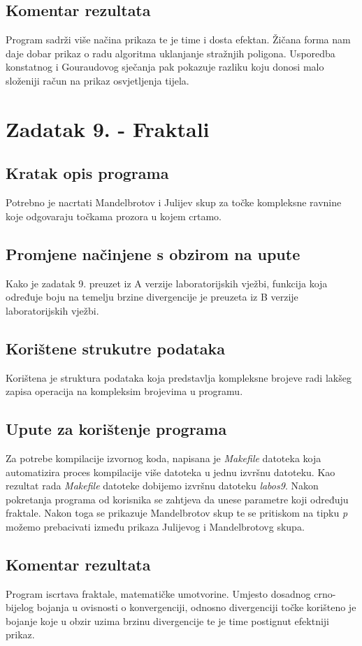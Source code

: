 \documentclass{report}
\begin{document}
\subsection{Komentar rezultata}
Program sadrži više načina prikaza te je time i dosta efektan. Žičana forma nam daje dobar prikaz o radu algoritma uklanjanje stražnjih poligona. Usporedba konstatnog i Gouraudovog sječanja pak pokazuje razliku koju donosi malo složeniji račun na prikaz osvjetljenja tijela.

\section{Zadatak 9. - Fraktali}
\subsection{Kratak opis programa}
Potrebno je nacrtati Mandelbrotov i Julijev skup za točke kompleksne ravnine koje odgovaraju točkama prozora u kojem crtamo. 

\subsection{Promjene načinjene s obzirom na upute}
Kako je zadatak 9. preuzet iz A verzije laboratorijskih vježbi, funkcija koja određuje boju na temelju brzine divergencije je preuzeta iz B verzije laboratorijskih vježbi.

\subsection{Korištene strukutre podataka}
Korištena je struktura podataka koja predstavlja kompleksne brojeve radi lakšeg zapisa operacija na kompleksim brojevima u programu.

\subsection{Upute za korištenje programa}
Za potrebe kompilacije izvornog koda, napisana je \textit{Makefile} datoteka koja automatizira proces kompilacije više datoteka u jednu izvršnu datoteku. Kao rezultat rada \textit{Makefile} datoteke dobijemo izvršnu datoteku \textit{labos9}. Nakon pokretanja programa od korisnika se zahtjeva da unese parametre koji određuju fraktale. Nakon toga se prikazuje Mandelbrotov skup te se pritiskom na tipku \textit{p} možemo prebacivati između prikaza Julijevog i Mandelbrotovg skupa.

\subsection{Komentar rezultata}
Program iscrtava fraktale, matematičke umotvorine. Umjesto dosadnog crno-bijelog bojanja u ovisnosti o konvergenciji, odnosno divergenciji točke korišteno je bojanje koje u obzir uzima brzinu divergencije te je time postignut efektniji prikaz.
\end{document}
